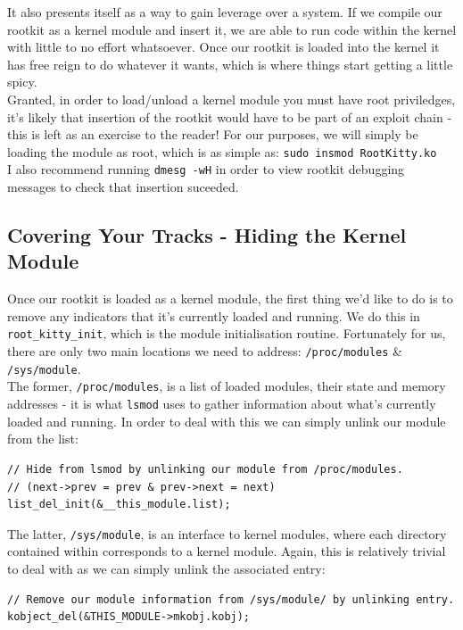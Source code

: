 \documentclass[11pt]{article}
\begin{document}
It also presents itself as a way to gain leverage over a system. If we compile our rootkit as a kernel module and insert it, we are able to run code within the kernel with little to no effort whatsoever. Once our rootkit is loaded into the kernel it has free reign to do whatever it wants, which is where things start getting a little spicy.\\

Granted, in order to load/unload a kernel module you must have root priviledges, it's likely that insertion of the rootkit would have to be part of an exploit chain - this is left as an exercise to the reader! For our purposes, we will simply be loading the module as root, which is as simple as:
\texttt{sudo insmod RootKitty.ko}\\

I also recommend running \texttt{dmesg -wH} in order to view rootkit debugging messages to check that insertion suceeded.

\subsection{Covering Your Tracks - Hiding the Kernel Module}
Once our rootkit is loaded as a kernel module, the first thing we'd like to do is to remove any indicators that it's currently loaded and running. We do this in \texttt{root_kitty_init}, which is the module initialisation routine. Fortunately for us, there are only two main locations we need to address: \texttt{/proc/modules} \& \texttt{/sys/module}.\\

The former, \texttt{/proc/modules}, is a list of loaded modules, their state and memory addresses - it is what \texttt{lsmod} uses to gather information about what's currently loaded and running. In order to deal with this we can simply unlink our module from the list:
\begin{verbatim}
// Hide from lsmod by unlinking our module from /proc/modules.
// (next->prev = prev & prev->next = next)
list_del_init(&__this_module.list);
\end{verbatim}

The latter, \texttt{/sys/module}, is an interface to kernel modules, where each directory contained within corresponds to a kernel module. Again, this is relatively trivial to deal with as we can simply unlink the associated entry:
\begin{verbatim}
// Remove our module information from /sys/module/ by unlinking entry.
kobject_del(&THIS_MODULE->mkobj.kobj);
\end{verbatim}
\end{document}
